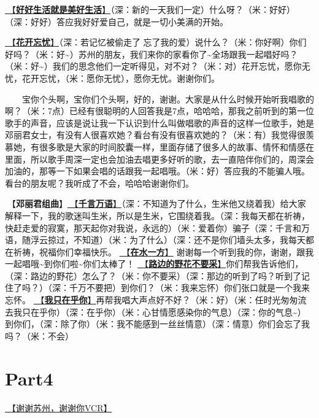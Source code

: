 \documentclass[]{ctexbook}
\begin{document}
\hyperref[live-happy-life-happy]{🎵【\textbf{好好生活就是美好生活}】}（深：新的一天我们一定）什么呀？（米：好好）（深：好好）答应我好好爱自己，就是一切小美满的开始。

\hyperref[no-worries]{🎵【\textbf{花开忘忧}】}（深：若记忆被偷走了 忘了我的爱）说什么？（米：你好啊）你们好吗？（米：好\textasciitilde）苏州的朋友，我们来你的家看你了\textasciitilde 全场跟我一起唱好吗？（米：好\textasciitilde）我们的思念他们一定听得见，对不对？（米：对）花开忘忧，愿你无忧，花开忘忧，（米：愿你无忧），愿你无忧。谢谢你们。

  宝你个头啊，宝你们个头啊，好的，谢谢。大家是从什么时候开始听我唱歌的啊？（米：7点）已经有很聪明的人回答我是7点，哈哈哈，那我之前听到的第一位歌手的声音，应该是说让我一下认识到什么叫做唱歌的声音的这样一位歌手，她是邓丽君女士，有没有人很喜欢她？看台有没有很喜欢她的？（米：有）我觉得很羡慕她，有很多歌是大家的时间胶囊一样，里面存储了很多人的故事、情怀和情感在里面，所以歌手周深一定也会加油去唱更多好听的歌，去一直陪伴你们的，周深会加油的，那等一下如果会唱的话跟我一起唱哦。（米：好）答应我的不能骗人哦。看台的朋友呢？我听成了不会，哈哈哈谢谢你们。

🎵【\textbf{邓丽君组曲}】\hyperref[thousands-of-words]{🎵【\textbf{千言万语}】}（深：不知道为了什么，生米他又绕着我）给大家解释一下，我的歌迷叫生米，所以是生米，它围绕着我。（深：我每天都在祈祷，快赶走爱的寂寞，那天起你对我说，永远的）（米：爱着你）骗子（深：千言和万语，随浮云掠过，不知道）（米：为了什么）（深：还不是你们墙头太多，我每天都在祈祷，祝福你们幸福快乐。
\hyperref[on-the-water-side]{🎵【\textbf{在水一方}】} 谢谢每一个听到我的你，谢谢，跟我一起唱哦\textasciitilde 到你们啦\textasciitilde 你们太棒了！
\hyperref[only-with-me]{🎵【\textbf{路边的野花不要采}】}你们帮我告诉他们，（深：路边的野花）怎么了？（米：你不要采）（深：那边的听到了吗？听到了记住了吗？）（深：千万不要把）到你们？（米：我来忘怀）你们张口就是一个我来忘怀。
\hyperref[only-you]{🎵【\textbf{我只在乎你}】}再帮我唱大声点好不好？（米：好）（米：任时光匆匆流去我只在乎你）（深：在乎你）（米：心甘情愿感染你的气息）（深：你的气息\textasciitilde）到你们，（深：除了你）（米：我不能感到一丝丝情意）（深：情意）你们会忘了我吗？（米：不会）

\section{Part4}\label{suzhou-20241110-part4}

\hyperref[thank-you-vcr]{🎥【谢谢苏州，谢谢你VCR】}
\end{document}
